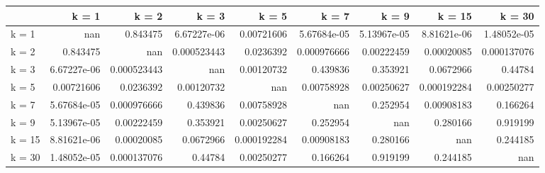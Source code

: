 \begin{tabular}{lrrrrrrrr}
\toprule
        &         k = 1 &         k = 2 &         k = 3 &         k = 5 &         k = 7 &         k = 9 &        k = 15 &        k = 30 \\
\midrule
 k = 1  & nan           &   0.843475    &   6.67227e-06 &   0.00721606  &   5.67684e-05 &   5.13967e-05 &   8.81621e-06 &   1.48052e-05 \\
 k = 2  &   0.843475    & nan           &   0.000523443 &   0.0236392   &   0.000976666 &   0.00222459  &   0.00020085  &   0.000137076 \\
 k = 3  &   6.67227e-06 &   0.000523443 & nan           &   0.00120732  &   0.439836    &   0.353921    &   0.0672966   &   0.44784     \\
 k = 5  &   0.00721606  &   0.0236392   &   0.00120732  & nan           &   0.00758928  &   0.00250627  &   0.000192284 &   0.00250277  \\
 k = 7  &   5.67684e-05 &   0.000976666 &   0.439836    &   0.00758928  & nan           &   0.252954    &   0.00908183  &   0.166264    \\
 k = 9  &   5.13967e-05 &   0.00222459  &   0.353921    &   0.00250627  &   0.252954    & nan           &   0.280166    &   0.919199    \\
 k = 15 &   8.81621e-06 &   0.00020085  &   0.0672966   &   0.000192284 &   0.00908183  &   0.280166    & nan           &   0.244185    \\
 k = 30 &   1.48052e-05 &   0.000137076 &   0.44784     &   0.00250277  &   0.166264    &   0.919199    &   0.244185    & nan           \\
\bottomrule
\end{tabular}